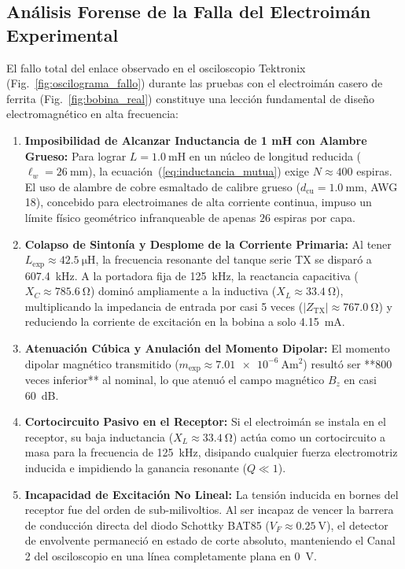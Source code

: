 \subsection{Análisis Forense de la Falla del Electroimán Experimental}
\label{subsec:analisis_forense_electroiman}

El fallo total del enlace observado en el osciloscopio Tektronix (Fig.~\ref{fig:oscilograma_fallo}) durante las pruebas con el electroimán casero de ferrita (Fig.~\ref{fig:bobina_real}) constituye una lección fundamental de diseño electromagnético en alta frecuencia:
\begin{enumerate}
    \item \textbf{Imposibilidad de Alcanzar Inductancia de 1 mH con Alambre Grueso:} Para lograr $L = \SI{1.0}{\milli\henry}$ en un núcleo de longitud reducida ($\ell_w = \SI{26}{\milli\meter}$), la ecuación~(\ref{eq:inductancia_mutua}) exige $N \approx 400$ espiras. El uso de alambre de cobre esmaltado de calibre grueso ($d_{\text{cu}} = \SI{1.0}{\milli\meter}$, AWG 18), concebido para electroimanes de alta corriente continua, impuso un límite físico geométrico infranqueable de apenas $26$ espiras por capa.
    \item \textbf{Colapso de Sintonía y Desplome de la Corriente Primaria:} Al tener $L_{\text{exp}} \approx \SI{42.5}{\micro\henry}$, la frecuencia resonante del tanque serie TX se disparó a \SI{607.4}{\kilo\hertz}. A la portadora fija de \SI{125}{\kilo\hertz}, la reactancia capacitiva ($X_C \approx \SI{785.6}{\ohm}$) dominó ampliamente a la inductiva ($X_L \approx \SI{33.4}{\ohm}$), multiplicando la impedancia de entrada por casi 5 veces ($|Z_{\text{TX}}| \approx \SI{767.0}{\ohm}$) y reduciendo la corriente de excitación en la bobina a solo \SI{4.15}{\milli\ampere}.
    \item \textbf{Atenuación Cúbica y Anulación del Momento Dipolar:} El momento dipolar magnético transmitido ($m_{\text{exp}} \approx \SI{7.01e-6}{\ampere\meter\squared}$) resultó ser **800 veces inferior** al nominal, lo que atenuó el campo magnético $B_z$ en casi \SI{60}{\deci\bel}.
    \item \textbf{Cortocircuito Pasivo en el Receptor:} Si el electroimán se instala en el receptor, su baja inductancia ($X_L \approx \SI{33.4}{\ohm}$) actúa como un cortocircuito a masa para la frecuencia de \SI{125}{\kilo\hertz}, disipando cualquier fuerza electromotriz inducida e impidiendo la ganancia resonante ($Q \ll 1$).
    \item \textbf{Incapacidad de Excitación No Lineal:} La tensión inducida en bornes del receptor fue del orden de sub-milivoltios. Al ser incapaz de vencer la barrera de conducción directa del diodo Schottky BAT85 ($V_F \approx \SI{0.25}{\volt}$), el detector de envolvente permaneció en estado de corte absoluto, manteniendo el Canal 2 del osciloscopio en una línea completamente plana en \SI{0}{\volt}.
\end{enumerate}

